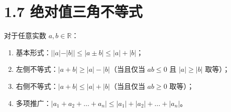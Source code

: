 \documentclass{article}
\begin{document}
\section*{1.7 绝对值三角不等式}
对于任意实数 \( a,b \in \mathbb{R} \)：
\begin{enumerate}
    \item 基本形式：\( ||a| - |b|| \leq |a \pm b| \leq |a| + |b| \)；
    \item 左侧不等式：\( |a+b| \geq |a| - |b| \)（当且仅当 \( ab \leq 0 \) 且 \( |a| \geq |b| \) 取等）；
    \item 右侧不等式：\( |a+b| \leq |a| + |b| \)（当且仅当 \( ab \geq 0 \) 取等）；
    \item 多项推广：\( |a_1+a_2+\dots+a_n| \leq |a_1|+|a_2|+\dots+|a_n| \)。
\end{enumerate}
\end{document}
